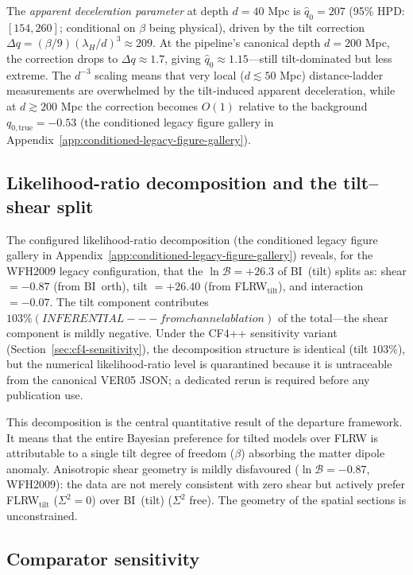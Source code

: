 The \emph{apparent deceleration parameter} at depth $d = 40$ Mpc
is $\hat{q}_0 = 207$ (95\% HPD: $[154, 260]$; conditional on
$\beta$ being physical), driven by the
tilt correction
$\Delta q = (\beta/9)(\lambda_H/d)^3 \approx 209$.
At the pipeline's canonical depth $d = 200$ Mpc, the correction
drops to $\Delta q \approx 1.7$, giving
$\hat{q}_0 \approx 1.15$---still tilt-dominated but less extreme.
The $d^{-3}$ scaling means that very local ($d \lesssim 50$ Mpc)
distance-ladder measurements are overwhelmed by the tilt-induced
apparent deceleration, while at $d \gtrsim 200$ Mpc the correction
becomes $O(1)$ relative to the background
$q_{0,\mathrm{true}} = -0.53$
(the conditioned legacy figure gallery in Appendix~\ref{app:conditioned-legacy-figure-gallery}).


\subsection{Likelihood-ratio decomposition and the tilt--shear split}
\label{sec:tilt-shear-split}

The configured likelihood-ratio decomposition
(the conditioned legacy figure gallery in Appendix~\ref{app:conditioned-legacy-figure-gallery}) reveals, for the WFH2009
legacy configuration, that the $\ln\mathcal{B} = +26.3$ of
BI~(tilt) splits as:
shear $= -0.87$ (from BI~orth),
tilt $= +26.40$ (from FLRW$_{\mathrm{tilt}}$),
and interaction $= -0.07$.
The tilt component contributes $103\% (INFERENTIAL --- from channel ablation)$ of the total---the
shear component is mildly negative.  Under the CF4++ sensitivity
variant (Section~\ref{sec:cf4-sensitivity}), the decomposition
structure is identical (tilt $103\%$), but the numerical
likelihood-ratio level is quarantined because it is untraceable from the
canonical VER05 JSON; a dedicated rerun is required before any
publication use.

This decomposition is the central quantitative result of the
departure framework.  It means that the entire Bayesian
preference for tilted models over FLRW is attributable to a
single tilt degree of freedom ($\beta$) absorbing the matter
dipole anomaly.  Anisotropic shear geometry is mildly
disfavoured ($\ln\mathcal{B} = -0.87$, WFH2009): the data are
not merely consistent with zero shear but actively prefer
FLRW$_{\mathrm{tilt}}$ ($\Sigma^2 = 0$) over BI~(tilt)
($\Sigma^2$ free).  The geometry of
the spatial sections is unconstrained.


\subsection{Comparator sensitivity}
\label{sec:comparator-results}


